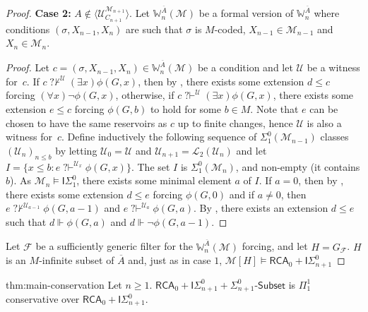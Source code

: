 \documentclass{article}
\def\WW{\mathbb{W}}
\def\F{\mathcal{F}}
\def\U{\mathcal{U}}
\def\M{\mathcal{M}}
\renewcommand{\L}[0]{\mathcal{L}}
\newcommand{\ISig}{\mathsf{I}\Sigma^0}
\newcommand{\qvdash}{\operatorname{{?}{\vdash}}}
\newcommand{\nqvdash}{\operatorname{{?}{\nvdash}}}
\newcommand{\Sub}[1]{{#1}\mbox{-}\mathsf{Subset}}
\newcommand{\RCA}{\mathsf{RCA}}
\numberwithin{theorem}{section}
\newtheorem{lemma}[theorem]{Lemma}
\theoremstyle{definition}
\begin{document}
\begin{proof}
\textbf{Case 2:} $A \notin \langle \U_{C_{n+1}}^{\M_{n+1}} \rangle$. Let $\WW^{\overline{A}}_n(\M)$ be a formal version of $\WW^{\overline{A}}_n$ where conditions $(\sigma,X_{n-1},X_n)$ are such that $\sigma$ is $M$-coded, $X_{n-1} \in \M_{n-1}$ and $X_n \in \M_n$. 

\begin{proof}
Let $c = (\sigma,X_{n-1},X_n) \in \WW^{\overline{A}}_n(\M)$ be a condition and let $\U$ be a witness for~$c$. If $c \nqvdash^{\U} (\exists x)\phi(G,x)$, then by , there exists some extension $d \leq c$ forcing $(\forall x) \neg \phi(G,x)$, otherwise, if $c \qvdash^{\U} (\exists x)\phi(G,x)$, there exists some extension $e \leq c$ forcing $\phi(G,b)$ to hold for some $b \in M$. Note that $e$ can be chosen to have the same reservoirs as $c$ up to finite changes, hence $\U$ is also a witness for~$c$. Define inductively the following sequence of $\Sigma_1^0(\M_{n-1})$ classes $(\U_n)_{n \leq b}$ by letting $\U_0 = \U$ and $\U_{n+1} = \L_2(\U_n)$ and let $I = \{ x \leq b : e \qvdash^{\U_x} \phi(G, x) \}$. The set $I$ is $\Sigma_1^0(\M_n)$, and non-empty (it contains $b$). As $\M_n \models \ISig_1$, there exists some minimal element $a$ of $I$. If $a = 0$, then by , there exists some extension $d \leq e$ forcing $\phi(G,0)$ and if $a \neq 0$, then $e \nqvdash^{\U_{a-1}} \phi(G,a-1)$ and $e \qvdash^{\U_a} \phi(G,a)$. By , there exists an extension $d \leq e$ such that $d \Vdash \phi(G,a)$ and $d \Vdash \neg \phi(G,a-1)$.
\end{proof}

Let $\F$ be a sufficiently generic filter for the $\WW^{\overline{A}}_n(\M)$ forcing, and let $H = G_{\F}$. $H$ is an $M$-infinite subset of $\overline{A}$ and, just as in case $1$, $\M[H] \models \RCA_0 + \ISig_{n+1}$
\end{proof}

\begin{repmaintheorem}{thm:main-conservation}
Let $n \geq 1$. $\RCA_0 + \ISig_{n+1} + \Sub{\Sigma^0_{n+1}}$ is $\Pi_1^1$ conservative over $\RCA_0 + \ISig_{n+1}$.
\end{repmaintheorem}
\end{document}
